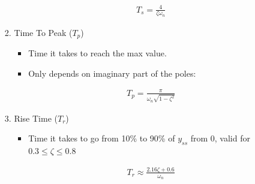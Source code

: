 \begin{enumerate}
\begin{enumerate}
\begin{enumerate}
\begin{itemize}
                            \begin{align*}
                                T_s = \frac{4}{\zeta \omega_n}
                            \end{align*}
                        \end{itemize}

                    \item Time To Peak ($T_p$)

                        \begin{itemize}
                            \item Time it takes to reach the max value.
                            \item Only depends on imaginary part of the poles:

                            \begin{align*}
                                T_p = \frac{\pi}{\omega_n \sqrt{1 - \zeta^2}}
                            \end{align*}
                        \end{itemize}

                    \item Rise Time ($T_r$)

                        \begin{itemize}
                            \item Time it takes to go from 10\% to 90\% of $y_{ss}$ from $0$, valid for $0.3 \le \zeta \le 0.8$

                            \begin{align*}
                                T_r \approx \frac{2.16\zeta + 0.6}{\omega_n}
                            \end{align*}
                        \end{itemize}
                \end{enumerate}
        \end{enumerate}


\end{enumerate}
